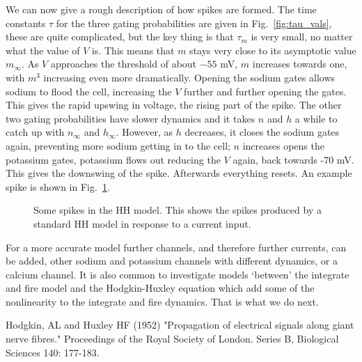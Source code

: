\documentclass[12pt]{article}
\begin{document}
We can now give a rough description of how spikes are formed. The time
constants $\tau$ for the three gating probabilities are given in
Fig.~\ref{fig:tau_vals}, these are quite complicated, but the key
thing is that $\tau_m$ is very small, no matter what the value of $V$
is. This means that $m$ stays very close to its asymptotic value
$m_\infty$. As $V$ approaches the threshold of about $-55$ mV, $m$
increases towards one, with $m^3$ increasing even more
dramatically. Opening the sodium gates allows sodium to flood the
cell, increasing the $V$ further and further opening the gates. This
gives the rapid upswing in voltage, the rising part of the spike. The
other two gating probabilities have slower dynamics and it takes $n$
and $h$ a while to catch up with $n_\infty$ and $h_\infty$. However,
as $h$ decreases, it closes the sodium gates again, preventing more
sodium getting in to the cell; $n$ increases opens the potassium
gates, potassium flows out reducing the $V$ again, back towards -70
mV. This gives the downswing of the spike. Afterwards everything
resets. An example spike is shown in Fig.~\ref{fig:HH_spike}.

\begin{figure}
\begin{center}

\end{center}
\caption{Some spikes in the HH model. This shows the spikes produced by a standard HH model in response to a current input.\label{fig:HH_spike}}
\end{figure}

For a more accurate model further channels, and therefore further
currents, can be added, other sodium and potassium channels with
different dynamics, or a calcium channel. It is also common to
investigate models \lq{}between\rq{} the integrate and fire model and
the Hodgkin-Huxley equation which add some of the nonlinearity to the
integrate and fire dynamics. That is what we do next.


\begin{thebibliography}{99}
Hodgkin, AL and Huxley HF (1952) 
\newblock"Propagation of electrical signals along giant nerve fibres." 
\newblock Proceedings of the Royal Society of London. Series B, Biological Sciences 140: 177-183.
\end{thebibliography}
\end{document}
